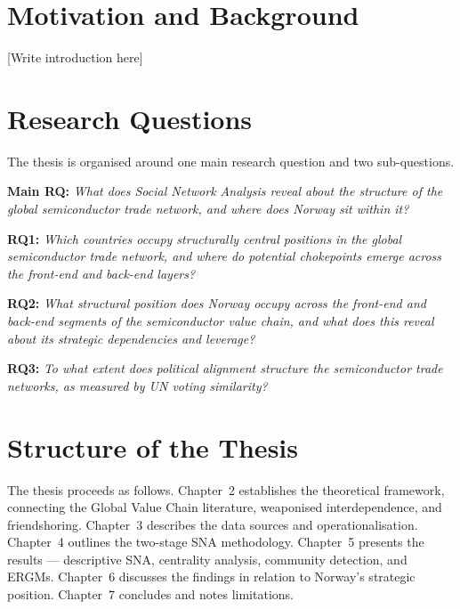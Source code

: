 
\section{Motivation and Background}


[Write introduction here]

\section{Research Questions}

The thesis is organised around one main research question and two sub-questions.

\bigskip
\noindent\textbf{Main RQ:} \textit{What does Social Network Analysis reveal about the structure of the global semiconductor trade network, and where does Norway sit within it?}

\bigskip
\noindent\textbf{RQ1:} \textit{Which countries occupy structurally central positions in the global semiconductor trade network, and where do potential chokepoints emerge across the front-end and back-end layers?}


\bigskip
\noindent\textbf{RQ2:} \textit{What structural position does Norway occupy across the front-end and back-end segments of the semiconductor value chain, and what does this reveal about its strategic dependencies and leverage?}

\bigskip
\noindent\textbf{RQ3:} \textit{To what extent does political alignment structure the semiconductor trade networks, as measured by UN voting similarity?}

\section{Structure of the Thesis}

The thesis proceeds as follows. Chapter~2 establishes the theoretical
framework, connecting the Global Value Chain literature, weaponised
interdependence, and friendshoring. Chapter~3 describes the data sources and
operationalisation. Chapter~4 outlines the two-stage SNA methodology.
Chapter~5 presents the results --- descriptive SNA, centrality analysis,
community detection, and ERGMs. Chapter~6 discusses the findings in relation
to Norway's strategic position. Chapter~7 concludes and notes limitations.
